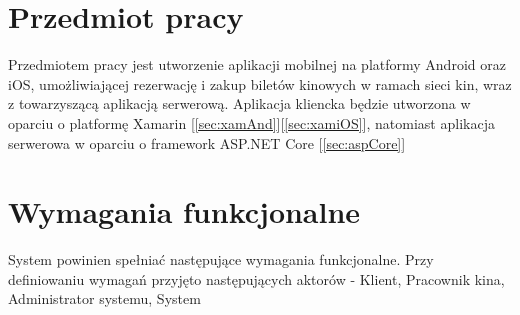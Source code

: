 \section{Przedmiot pracy}
Przedmiotem pracy jest utworzenie aplikacji mobilnej na platformy Android oraz iOS, umożliwiającej rezerwację i zakup biletów kinowych w ramach sieci kin, wraz z towarzyszącą aplikacją serwerową. Aplikacja kliencka będzie utworzona w oparciu o platformę Xamarin [\ref{sec:xamAnd}][\ref{sec:xamiOS}], natomiast aplikacja serwerowa w oparciu o framework ASP.NET Core [\ref{sec:aspCore}]
\section{Wymagania funkcjonalne}
System powinien spełniać następujące wymagania funkcjonalne. Przy definiowaniu wymagań przyjęto następujących aktorów - Klient, Pracownik kina, Administrator systemu, System 
